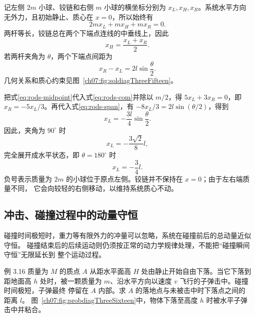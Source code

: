 \begin{xesolution}
记左侧 $2m$ 小球、铰链和右侧 $m$ 小球的横坐标分别为 $x_L,x_H,x_R$。系统水平方向
无外力，且初始静止、质心在 $x=0$，所以始终有
\begin{equation}\label{eq:rods-com}
 2m x_L+m x_H+m x_R=0.
\end{equation}
两杆等长，铰链总在两个下端点连线的中垂线上，因此
\begin{equation}\label{eq:rods-midpoint}
 x_H=\frac{x_L+x_R}{2}.
\end{equation}
若两杆夹角为 $\theta$，两个下端点间距为
\begin{equation}\label{eq:rods-span}
 x_R-x_L=2l\sin\frac{\theta}{2}.
\end{equation}
几何关系和质心约束见图~\ref{ch07:fig:soldiagThreeFifteen}。

\soldiagThreeFifteen
把式\eqref{eq:rods-midpoint}代入式\eqref{eq:rods-com}并除以 $m/2$，得
$5x_L+3x_R=0$，即 $x_R=-5x_L/3$。再代入式\eqref{eq:rods-span}，有
$-8x_L/3=2l\sin(\theta/2)$，得到
\[
 x_L=-\frac{3l}{4}\sin\frac{\theta}{2}.
\]
因此，夹角为 $90^\circ$ 时
\[
 \boxed{x_L=-\frac{3\sqrt2}{8}l},
\]
完全展开成水平状态，即 $\theta=180^\circ$ 时
\[
 \boxed{x_L=-\frac34l}.
\]
负号表示质量为 $2m$ 的小球位于原点左侧。铰链并不保持在 $x=0$；由于左右端质量不同，
它会向较轻的右侧移动，以维持系统质心不动。
\end{xesolution}

\subsection{冲击、碰撞过程中的动量守恒}

碰撞时间极短时，重力等有限外力的冲量可以忽略，系统在碰撞前后的总动量近似守恒。
碰撞结束后的后续运动则仍须按正常的动力学规律处理，不能把“碰撞瞬间守恒”无限延长到
整个运动过程。

\Needspace{0.34\textheight}
\begin{origexamplebox}{例 3.16}
质量为 $M$ 的质点 $A$ 从距水平面高 $H$ 处由静止开始自由下落。当它下落到距地面高 $h$
处时，被一颗质量为 $m$、沿水平方向以速度 $v$ 飞行的子弹击中。碰撞时间极短，子弹最终
停留在 $A$ 内部。求 $A$ 的落地点与未被击中时下落点之间的距离 $l$。
图~\ref{ch07:fig:probdiagThreeSixteen}中，物体下落至高度 $h$ 时被水平子弹击中并粘合。
\probdiagThreeSixteen
\end{origexamplebox}

